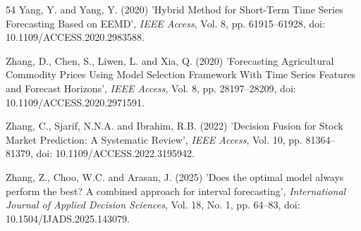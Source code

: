 \documentclass{singlecol-new}
\theoremstyle{TH}{
\newtheorem{lemma}{Lemma}
\newtheorem{theorem}[lemma]{Theorem}
\newtheorem{corrolary}[lemma]{Corrolary}
\newtheorem{conjecture}[lemma]{Conjecture}
\newtheorem{proposition}[lemma]{Proposition}
\newtheorem{claim}[lemma]{Claim}
\newtheorem{stheorem}[lemma]{Wrong Theorem}
\newtheorem{algorithm}{Algorithm}
}
\theoremstyle{THrm}{
\newtheorem{definition}{Definition}[section]
\newtheorem{question}{Question}[section]
\newtheorem{remark}{Remark}
\newtheorem{scheme}{Scheme}
}
\theoremstyle{THhit}{
\newtheorem{case}{Case}[section]
}
\begin{document}
\begin{thebibliography}{54}
Yang, Y. and Yang, Y. (2020) 'Hybrid Method for Short-Term Time Series Forecasting Based on EEMD', {\it IEEE Access}, Vol. 8, pp. 61915--61928, doi: 10.1109/ACCESS.2020.2983588.

Zhang, D., Chen, S., Liwen, L. and Xia, Q. (2020) 'Forecasting Agricultural Commodity Prices Using Model Selection Framework With Time Series Features and Forecast Horizons', {\it IEEE Access}, Vol. 8, pp. 28197--28209, doi: 10.1109/ACCESS.2020.2971591.

Zhang, C., Sjarif, N.N.A. and Ibrahim, R.B. (2022) 'Decision Fusion for Stock Market Prediction: A Systematic Review', {\it IEEE Access}, Vol. 10, pp. 81364--81379, doi: 10.1109/ACCESS.2022.3195942.

Zhang, Z., Choo, W.C. and Arasan, J. (2025) 'Does the optimal model always perform the best? A combined approach for interval forecasting', {\it International Journal of Applied Decision Sciences}, Vol. 18, No. 1, pp. 64--83, doi: 10.1504/IJADS.2025.143079.

\end{thebibliography}
\end{document}
